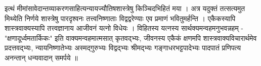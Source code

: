 इत्थं मीमांसावेदान्तव्याकरणसाहित्यन्यायज्यौतिषशास्त्रेषु किञ्चिदभिहितं मया । अत्र यदुक्तं तत्सत्यमुत मिथ्येति निर्णये शास्त्रेषु पारदृश्वनः तत्त्वनिष्णाताः विद्वद्वरेण्याः एव प्रमाणं भवितुमर्हन्ति । एकैकस्यापि शास्त्रवाक्यस्यापि तत्त्वज्ञानाय आजीवनं यत्नो विधेयः । विहितस्य यत्नस्य सार्थक्यमन्वहमनुभवन्नहम् - "क्षणादूर्ध्वमतार्किकः" इति वाक्यमन्वहमात्मसात् कृतवद्भ्यः, जीवनस्य एकैकं क्षणमपि शास्त्रवाक्यविचारार्थमेव प्रदत्तवद्भ्यः, न्यायनिष्णातेभ्यः अस्मद्गुरुभ्यः विद्वद्भ्यः श्रीमद्भ्यः गङ्गाधरभट्टपादेभ्यः पादपातं प्रणिपत्य अनन्तान् धन्यवादान् समर्पये ॥
					
